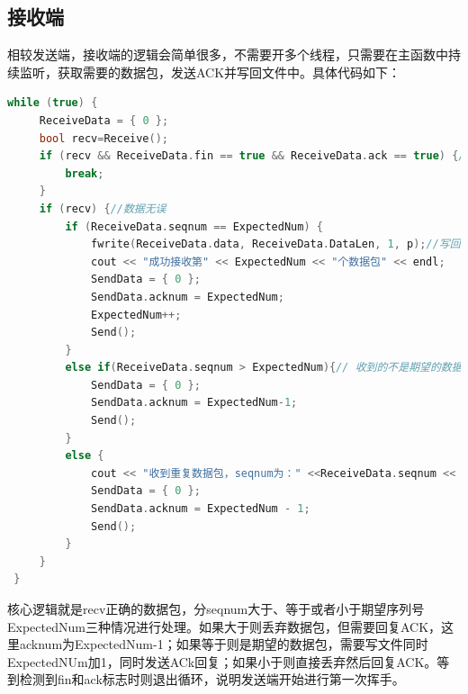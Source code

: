 \documentclass[UTF8,a4paper,10pt]{ctexart}
\begin{document}
\subsection{接收端}
相较发送端，接收端的逻辑会简单很多，不需要开多个线程，只需要在主函数中持续监听，获取需要的数据包，发送ACK并写回文件中。具体代码如下：
\begin{lstlisting}[frame=trbl,language={C++}]
 while (true) {    
     ReceiveData = { 0 };
     bool recv=Receive();
     if (recv && ReceiveData.fin == true && ReceiveData.ack == true) {// 第一次挥手
         break;
     }
     if (recv) {//数据无误
         if (ReceiveData.seqnum == ExpectedNum) {
             fwrite(ReceiveData.data, ReceiveData.DataLen, 1, p);//写回文件
             cout << "成功接收第" << ExpectedNum << "个数据包" << endl;
             SendData = { 0 };
             SendData.acknum = ExpectedNum;
             ExpectedNum++;
             Send();
         }
         else if(ReceiveData.seqnum > ExpectedNum){// 收到的不是期望的数据包，但也需要回ACK
             SendData = { 0 };
             SendData.acknum = ExpectedNum-1;
             Send();
         }
         else {
             cout << "收到重复数据包，seqnum为：" <<ReceiveData.seqnum << endl;
             SendData = { 0 };
             SendData.acknum = ExpectedNum - 1;
             Send();
         }
     }
 }
 \end{lstlisting}\par
 核心逻辑就是recv正确的数据包，分seqnum大于、等于或者小于期望序列号ExpectedNum三种情况进行处理。如果大于则丢弃数据包，但需要回复ACK，这里acknum为ExpectedNum-1；如果等于则是期望的数据包，需要写文件同时ExpectedNUm加1，同时发送ACk回复；如果小于则直接丢弃然后回复ACK。等到检测到fin和ack标志时则退出循环，说明发送端开始进行第一次挥手。
 
\end{document}
